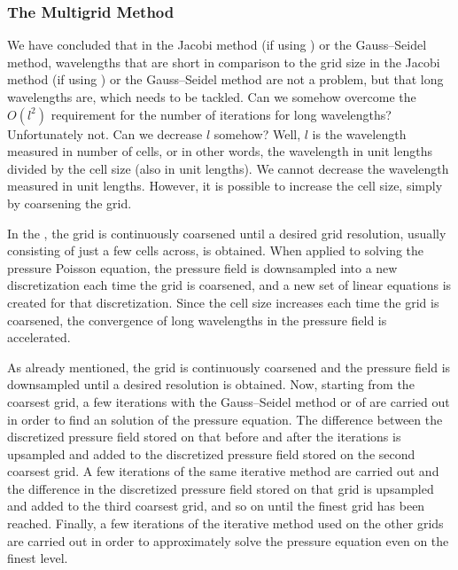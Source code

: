 
\subsubsection{The Multigrid Method}

We have concluded that in the Jacobi method (if using \SOR) or the Gauss--Seidel method, wavelengths that are short in comparison to the grid size in the Jacobi method (if using \SOR) or the Gauss--Seidel method are not a problem, but that long wavelengths are, which needs to be tackled. Can we somehow overcome the $O(l^2)$ requirement for the number of iterations for long wavelengths? Unfortunately not. Can we decrease $l$ somehow? Well, $l$ is the wavelength measured in number of cells, or in other words, the wavelength in unit lengths divided by the cell size (also in unit lengths). We cannot decrease the wavelength measured in unit lengths. However, it is possible to increase the cell size, simply by coarsening the grid.

In the , the grid is continuously coarsened until a desired grid resolution, usually consisting of just a few cells across, is obtained. When applied to solving the pressure Poisson equation, the pressure field is downsampled into a new discretization each time the grid is coarsened, and a new set of linear equations is created for that discretization. Since the cell size increases each time the grid is coarsened, the convergence of long wavelengths in the pressure field is accelerated.

As already mentioned, the grid is continuously coarsened and the pressure field is downsampled until a desired resolution is obtained. Now, starting from the coarsest grid, a few iterations with the Gauss--Seidel method or of \SOR are carried out in order to find an \approximate solution of the pressure equation. The difference between the discretized pressure field stored on that before and after the iterations is upsampled and added to the discretized pressure field stored on the second coarsest grid. A few iterations of the same iterative method are carried out and the difference in the discretized pressure field stored on that grid is upsampled and added to the third coarsest grid, and so on until the finest grid has been reached. Finally, a few iterations of the iterative method used on the other grids are carried out in order to approximately solve the pressure equation even on the finest level.

